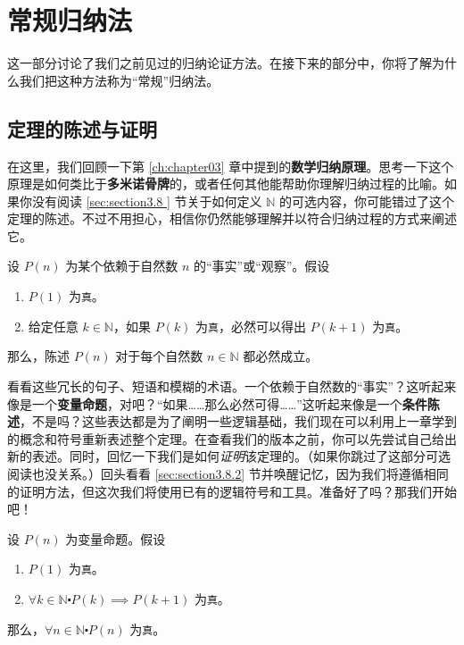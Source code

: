 \section{常规归纳法}

这一部分讨论了我们之前见过的归纳论证方法。在接下来的部分中，你将了解为什么我们把这种方法称为``常规''归纳法。

\subsection{定理的陈述与证明}

在这里，我们回顾一下第 \ref{ch:chapter03} 章中提到的\textbf{数学归纳原理}。思考一下这个原理是如何类比于\textbf{多米诺骨牌}的，或者任何其他能帮助你理解归纳过程的比喻。如果你没有阅读 \ref{sec:section3.8 } 节关于如何定义 $\mathbb{N}$ 的可选内容，你可能错过了这个定理的陈述。不过不用担心，相信你仍然能够理解并以符合归纳过程的方式来阐述它。

\begin{theorem}[数学归纳原理]
    设 $P(n)$ 为某个依赖于自然数 $n$ 的``事实''或``观察''。假设
    \begin{enumerate}
        \item $P(1)$ 为\verb|真|。
        \item 给定任意 $k \in \mathbb{N}$，如果 $P(k)$ 为\verb|真|，必然可以得出 $P(k+1)$ 为\verb|真|。
    \end{enumerate}
    那么，陈述 $P(n)$ 对于每个自然数 $n \in \mathbb{N}$ 都必然成立。
\end{theorem}

看看这些冗长的句子、短语和模糊的术语。一个依赖于自然数的``事实''？这听起来像是一个\textbf{变量命题}，对吧？``如果……那么必然可得……''这听起来像是一个\textbf{条件陈述}，不是吗？这些表达都是为了阐明一些逻辑基础，我们现在可以利用上一章学到的概念和符号重新表述整个定理。在查看我们的版本之前，你可以先尝试自己给出新的表述。同时，回忆一下我们是如何\emph{证明}该定理的。（如果你跳过了这部分可选阅读也没关系。）回头看看 \ref{sec:section3.8.2} 节并唤醒记忆，因为我们将遵循相同的证明方法，但这次我们将使用已有的逻辑符号和工具。准备好了吗？那我们开始吧！

\begin{theorem}[数学归纳原理]\label{theorem5.2.2}
    设 $P(n)$ 为变量命题。假设
    \begin{enumerate}[label=(\arabic*)]
        \item $P(1)$ 为\verb|真|。
        \item $\forall k \in \mathbb{N} \centerdot P(k) \implies P(k+1)$ 为\verb|真|。
    \end{enumerate}
    那么，$\forall n \in \mathbb{N} \centerdot P(n)$ 为\verb|真|。
\end{theorem}

